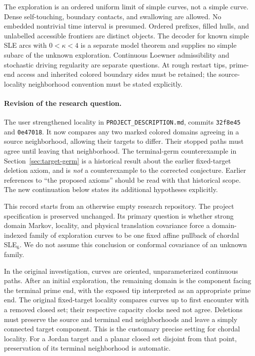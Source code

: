 \documentclass[11pt]{article}
\theoremstyle{definition}\newtheorem{definition}[theorem]{Definition}
\theoremstyle{remark}\newtheorem{remark}[theorem]{Remark}
\begin{document}
The exploration is an ordered uniform limit of simple curves, not a
simple curve. Dense self-touching, boundary contacts, and swallowing are
allowed. No embedded nontrivial time interval is presumed. Ordered
prefixes, filled hulls, and unlabelled accessible frontiers are distinct
objects. The decoder for known simple SLE arcs with $0<\kappa<4$ is a
separate model theorem and supplies no simple subarc of the unknown
exploration. Continuous Loewner admissibility and stochastic driving
regularity are separate questions. At rough restart tips, prime-end
access and inherited colored boundary sides must be retained; the
source-locality neighborhood convention must be stated explicitly.

\paragraph{Revision of the research question.}
The user strengthened locality in \texttt{PROJECT\_DESCRIPTION.md}, commits
\texttt{32f8e45} and \texttt{0e47018}. It now compares any two marked
colored domains agreeing in a source neighborhood, allowing their targets
to differ. Their stopped paths must agree until leaving that neighborhood.
The terminal-germ counterexample in Section~\ref{sec:target-germ} is a
historical result about the earlier fixed-target deletion axiom, and is
\emph{not} a counterexample to the corrected conjecture. Earlier references
to ``the proposed axioms'' should be read with that historical scope.
The new continuation below states its additional hypotheses explicitly.

This record starts from an otherwise empty research repository. The project
specification is preserved unchanged. Its primary question is whether strong
domain Markov, locality, and physical translation covariance force a
domain-indexed family of exploration curves to be one fixed affine pullback
of chordal SLE$_6$. We do not assume this conclusion or conformal covariance
of an unknown family.

In the original investigation, curves are oriented, unparameterized continuous paths. After an initial
exploration, the remaining domain is the component facing the terminal
prime end, with the exposed tip interpreted as an appropriate prime end.
The original fixed-target locality compares curves up to first encounter with a removed closed set;
their respective capacity clocks need not agree. Deletions must preserve
the source and terminal end neighborhoods and leave a simply connected
target component. This is the customary precise setting for chordal
locality. For a Jordan target and a planar closed set disjoint from that
point, preservation of its terminal neighborhood is automatic.
\end{document}
